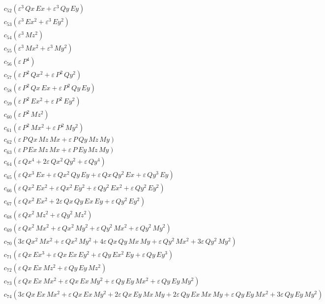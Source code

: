 \documentclass{article}
\begin{document}
\begin{align*}
  &\quad c_{52} \left(ε^{3}\,Qx\,Ex + ε^{3}\,Qy\,Ey\right) \\
  &\quad c_{53} \left(ε^{3}\,Ex^{2} + ε^{3}\,Ey^{2}\right) \\
  &\quad c_{54} \left(ε^{3}\,Mz^{2}\right) \\
  &\quad c_{55} \left(ε^{3}\,Mx^{2} + ε^{3}\,My^{2}\right) \\
  &\quad c_{56} \left(ε\,P^{4}\right) \\
  &\quad c_{57} \left(ε\,P^{2}\,Qx^{2} + ε\,P^{2}\,Qy^{2}\right) \\
  &\quad c_{58} \left(ε\,P^{2}\,Qx\,Ex + ε\,P^{2}\,Qy\,Ey\right) \\
  &\quad c_{59} \left(ε\,P^{2}\,Ex^{2} + ε\,P^{2}\,Ey^{2}\right) \\
  &\quad c_{60} \left(ε\,P^{2}\,Mz^{2}\right) \\
  &\quad c_{61} \left(ε\,P^{2}\,Mx^{2} + ε\,P^{2}\,My^{2}\right) \\
  &\quad c_{62} \left(ε\,P\,Qx\,Mz\,Mx + ε\,P\,Qy\,Mz\,My\right) \\
  &\quad c_{63} \left(ε\,P\,Ex\,Mz\,Mx + ε\,P\,Ey\,Mz\,My\right) \\
  &\quad c_{64} \left(ε\,Qx^{4} + 2ε\,Qx^{2}\,Qy^{2} + ε\,Qy^{4}\right) \\
  &\quad c_{65} \left(ε\,Qx^{3}\,Ex + ε\,Qx^{2}\,Qy\,Ey + ε\,Qx\,Qy^{2}\,Ex + ε\,Qy^{3}\,Ey\right) \\
  &\quad c_{66} \left(ε\,Qx^{2}\,Ex^{2} + ε\,Qx^{2}\,Ey^{2} + ε\,Qy^{2}\,Ex^{2} + ε\,Qy^{2}\,Ey^{2}\right) \\
  &\quad c_{67} \left(ε\,Qx^{2}\,Ex^{2} + 2ε\,Qx\,Qy\,Ex\,Ey + ε\,Qy^{2}\,Ey^{2}\right) \\
  &\quad c_{68} \left(ε\,Qx^{2}\,Mz^{2} + ε\,Qy^{2}\,Mz^{2}\right) \\
  &\quad c_{69} \left(ε\,Qx^{2}\,Mx^{2} + ε\,Qx^{2}\,My^{2} + ε\,Qy^{2}\,Mx^{2} + ε\,Qy^{2}\,My^{2}\right) \\
  &\quad c_{70} \left(3ε\,Qx^{2}\,Mx^{2} + ε\,Qx^{2}\,My^{2} + 4ε\,Qx\,Qy\,Mx\,My + ε\,Qy^{2}\,Mx^{2} + 3ε\,Qy^{2}\,My^{2}\right) \\
  &\quad c_{71} \left(ε\,Qx\,Ex^{3} + ε\,Qx\,Ex\,Ey^{2} + ε\,Qy\,Ex^{2}\,Ey + ε\,Qy\,Ey^{3}\right) \\
  &\quad c_{72} \left(ε\,Qx\,Ex\,Mz^{2} + ε\,Qy\,Ey\,Mz^{2}\right) \\
  &\quad c_{73} \left(ε\,Qx\,Ex\,Mx^{2} + ε\,Qx\,Ex\,My^{2} + ε\,Qy\,Ey\,Mx^{2} + ε\,Qy\,Ey\,My^{2}\right) \\
  &\quad c_{74} \left(3ε\,Qx\,Ex\,Mx^{2} + ε\,Qx\,Ex\,My^{2} + 2ε\,Qx\,Ey\,Mx\,My + 2ε\,Qy\,Ex\,Mx\,My + ε\,Qy\,Ey\,Mx^{2} + 3ε\,Qy\,Ey\,My^{2}\right) \\

\end{align*}
\end{document}
